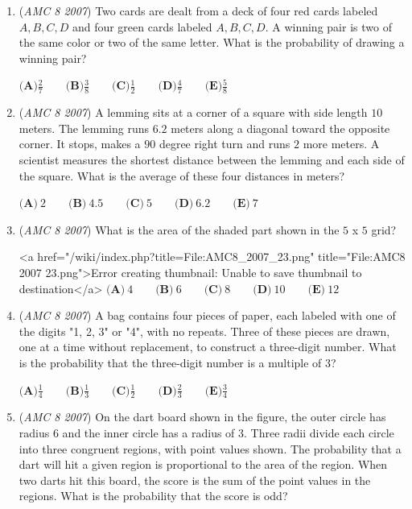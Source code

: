 \begin{enumerate}
	\item (\textit{AMC 8 2007}) Two cards are dealt from a deck of four red cards labeled $A, B, C, D$ and four
green cards labeled $A, B, C, D$. A winning pair is two of the same color or two
of the same letter. What is the probability of drawing a winning pair?


 $\textbf{(A)} \frac{2}{7} \qquad \textbf{(B)} \frac{3}{8} \qquad \textbf{(C)} \frac{1}{2} \qquad \textbf{(D)} \frac{4}{7} \qquad \textbf{(E)} \frac{5}{8}$


	\item (\textit{AMC 8 2007}) A lemming sits at a corner of a square with side length $10$ meters. The lemming
runs $6.2$ meters along a diagonal toward the opposite corner. It stops, makes
a $90$ degree right turn and runs $2$ more meters. A scientist measures the shortest
distance between the lemming and each side of the square. What is the average
of these four distances in meters?


 $\textbf{(A)}\ 2 \qquad \textbf{(B)}\ 4.5 \qquad \textbf{(C)}\ 5 \qquad \textbf{(D)}\ 6.2 \qquad \textbf{(E)}\ 7$


	\item (\textit{AMC 8 2007}) What is the area of the shaded part shown in the $5$ x $5$ grid?


 <a href="/wiki/index.php?title=File:AMC8\_2007\_23.png" title="File:AMC8 2007 23.png">Error creating thumbnail: Unable to save thumbnail to destination</a>
$\textbf{(A)}\ 4 \qquad\textbf{(B)}\ 6 \qquad\textbf{(C)}\ 8 \qquad\textbf{(D)}\ 10 \qquad\textbf{(E)}\ 12$


	\item (\textit{AMC 8 2007}) A bag contains four pieces of paper, each labeled with one of the digits "1, 2, 3"
or "4", with no repeats. Three of these pieces are drawn, one at a time without
replacement, to construct a three-digit number. What is the probability that
the three-digit number is a multiple of 3?


 $\textbf{(A)} \frac{1}{4} \qquad \textbf{(B)} \frac{1}{3} \qquad \textbf{(C)} \frac{1}{2} \qquad \textbf{(D)} \frac{2}{3} \qquad \textbf{(E)} \frac{3}{4}$


	\item (\textit{AMC 8 2007}) On the dart board shown in the figure, the outer circle has radius $6$ and the inner circle has a radius of 3.
Three radii divide each circle into three congruent
regions, with point values shown. The probability that a dart will hit a given
region is proportional to the area of the region. When two darts hit this board,
the score is the sum of the point values in the regions. What is the probability
that the score is odd?



\end{enumerate}
